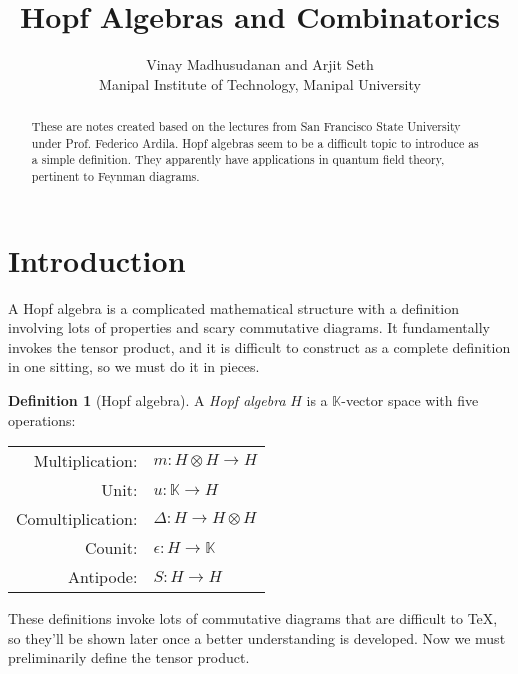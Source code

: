 \documentclass{article}
\theoremstyle{definition}
\newtheorem{Definition}{Definition}
\theoremstyle{remark}
\theoremstyle{underline}
\theoremstyle{underline}
\begin{document}
\title{\textbf{Hopf Algebras and Combinatorics}}

\author{\small Vinay Madhusudanan and Arjit Seth \\ \small Manipal Institute of Technology, Manipal University}
\date{}
\maketitle

\renewcommand{\abstractname}{Context}
\begin{abstract}
These are notes created based on the lectures from San Francisco State University under Prof. Federico Ardila. Hopf algebras seem to be a difficult topic to introduce as a simple definition. They apparently have applications in quantum field theory, pertinent to Feynman diagrams.
\end{abstract}

\begingroup
\let\clearpage\relax
\tableofcontents
\endgroup

\medskip
\medskip

\section{Introduction}\label{sec:Intro}
A Hopf algebra is a complicated mathematical structure with a definition involving lots of properties and scary commutative diagrams. It fundamentally invokes the tensor product, and it is difficult to construct as a complete definition in one sitting, so we must do it in pieces.

\begin{Definition}[Hopf algebra]\label{def:HopfAlg}
A \emph{Hopf algebra} $H$ is a $\mathbb{K}$-vector space with five operations:
\begin{center}
	\begin{tabular}{rl}
		Multiplication: &   $ m\colon H \otimes H \to H$\\
		Unit: & $u\colon \mathbb{K} \to H $ \\
		Comultiplication: & 	$ \Delta\colon H \to H \otimes H$\\
		Counit: & $\epsilon\colon H \to \mathbb{K}$ \\
		Antipode: &  $ S\colon H \to H $
	\end{tabular}
\end{center}
\end{Definition}

These definitions invoke lots of commutative diagrams that are difficult to \TeX, so they'll be shown later once a better understanding is developed. Now we must preliminarily define the tensor product.
\end{document}
